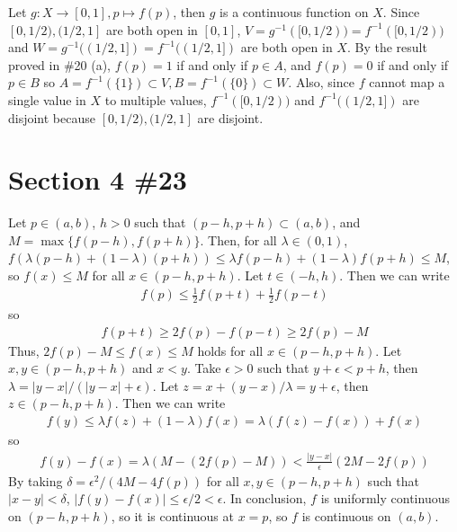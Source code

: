 \documentclass{scrartcl}
\begin{document}
Let \(g : X \to [0, 1], p \mapsto f(p)\), then \(g\) is a continuous function on \(X\).
Since \([0, 1/2), (1/2, 1]\) are both open in \([0, 1]\), \(V = g^{-1}([0, 1/2)) = f^{-1}([0, 1/2))\) and \(W = g^{-1}((1/2, 1]) = f^{-1}((1/2, 1])\) are both open in \(X\).
By the result proved in \#20 (a), \(f(p) = 1\) if and only if \(p \in A\), and \(f(p) = 0\) if and only if \(p \in B\) so \(A = f^{-1}(\{1\}) \subset V, B = f^{-1}(\{0\}) \subset W\).
Also, since \(f\) cannot map a single value in \(X\) to multiple values, \(f^{-1}([0, 1/2))\) and \(f^{-1}((1/2, 1])\) are disjoint because \([0, 1/2), (1/2, 1]\) are disjoint.

\section{Section 4 \#23}
Let \(p \in (a, b)\), \(h > 0\) such that \((p - h, p + h) \subset (a, b)\), and \(M = \max \{f(p - h), f(p + h)\}\).
Then, for all \(\lambda \in (0, 1)\), \(f(\lambda (p - h) + (1 - \lambda) (p + h)) \leq \lambda f(p - h) + (1 - \lambda) f(p + h) \leq M\), so \(f(x) \leq M\) for all \(x \in (p - h, p + h)\).
Let \(t \in (-h, h)\).
Then we can write
\begin{align*}
  f(p) \leq \frac{1}{2} f(p + t) + \frac{1}{2} f(p - t)
\end{align*}
so
\begin{align*}
  f(p + t) \geq 2f(p) - f(p - t) \geq 2f(p) - M
\end{align*}
Thus, \(2f(p) - M \leq f(x) \leq M\) holds for all \(x \in (p - h, p + h)\).
Let \(x, y \in (p - h, p + h)\) and \(x < y\).
Take \(\epsilon > 0\) such that \(y + \epsilon < p + h\), then \(\lambda = |y - x| / (|y - x| + \epsilon)\).
Let \(z = x + (y - x) / \lambda = y + \epsilon\), then \(z \in (p - h, p + h)\).
Then we can write
\begin{align*}
  f(y) \leq \lambda f(z) + (1 - \lambda) f(x) = \lambda (f(z) - f(x)) + f(x)
\end{align*}
so
\begin{align*}
  f(y) - f(x) = \lambda (M - (2f(p) - M)) < \frac{|y - x|}{\epsilon} (2M - 2f(p))
\end{align*}
By taking \(\delta = \epsilon^2 / (4M - 4f(p))\) for all \(x, y \in (p - h, p + h)\) such that \(|x - y| < \delta\), \(|f(y) - f(x)| \leq \epsilon / 2 < \epsilon\).
In conclusion, \(f\) is uniformly continuous on \((p - h, p + h)\), so it is continuous at \(x = p\), so \(f\) is continuous on \((a, b)\).
\end{document}
